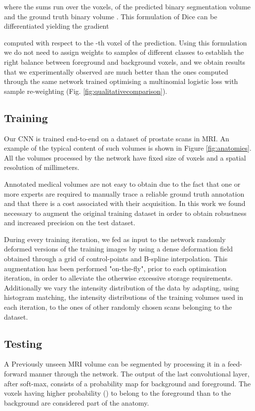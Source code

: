 \documentclass{llncs}
\begin{document}
where the sums run over the  voxels, of the predicted binary segmentation volume  and the ground truth binary volume . This formulation of Dice can be differentiated yielding the gradient  

computed with respect to the -th voxel of the prediction. Using this formulation we do not need to assign weights to samples of different classes to establish the right balance between foreground and background voxels, and we obtain results that we experimentally observed are much better than the ones computed through the same network trained optimising a multinomial logistic loss with sample re-weighting (Fig. \ref{fig:qualitativecomparison}). 

\subsection{Training}
Our CNN is trained end-to-end on a dataset of prostate scans in MRI. An example of the typical content of such volumes is shown in Figure \ref{fig:anatomies}. All the volumes processed by the network have fixed size of  voxels and a spatial resolution of  millimeters.

Annotated medical volumes are not easy to obtain due to the fact that one or more experts are required to manually trace a reliable ground truth annotation and that there is a cost associated with their acquisition. In this work we found necessary to augment the original training dataset in order to obtain robustness and increased precision on the test dataset. 

During every training iteration, we fed as input to the network randomly deformed versions of the training images by using a dense deformation field obtained through a  grid of control-points and B-spline interpolation. This augmentation has been performed "on-the-fly", prior to each optimisation iteration, in order to alleviate the otherwise excessive storage requirements. Additionally we vary the intensity distribution of the data by adapting, using histogram matching, the intensity distributions of the training volumes used in each iteration, to the ones of other randomly chosen scans belonging to the dataset.

\subsection{Testing}
A Previously unseen MRI volume can be segmented by processing it in a feed-forward manner through the network. The output of the last convolutional layer, after soft-max, consists of a probability map for background and foreground. The voxels having higher probability () to belong to the foreground than to the background are considered part of the anatomy.
 
\end{document}
